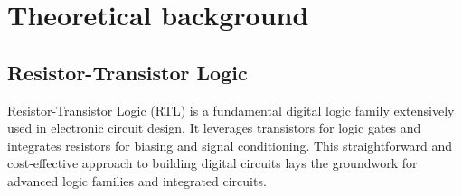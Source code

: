 \section{Theoretical background}

    \subsection{Resistor-Transistor Logic}
        Resistor-Transistor Logic (RTL) is a fundamental digital logic family extensively used in electronic circuit design. 
        It leverages transistors for logic gates and integrates resistors for biasing and signal conditioning. 
        This straightforward and cost-effective approach to building digital circuits lays the groundwork for advanced logic families and integrated circuits. 

